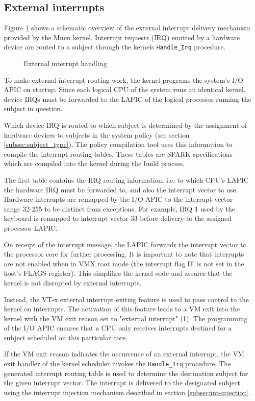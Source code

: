 \subsection{External interrupts}\label{subsec:external-ints}
Figure \ref{fig:external-interrupt} shows a schematic overview of the external
interrupt delivery mechanism provided by the Muen kernel. Interrupt requests
(IRQ) emitted by a hardware device are routed to a subject through
the kernels \texttt{Handle\_Irq} procedure.

\begin{figure}[h]
	\centering
	
	\caption{External interrupt handling}
	\label{fig:external-interrupt}
\end{figure}

To make external interrupt routing work, the kernel programs the system's I/O
APIC on startup. Since each logical CPU of the system runs an identical kernel,
device IRQs must be forwarded to the LAPIC of the logical processor running the
subject in question.

Which device IRQ is routed to which subject is determined by the assignment of
hardware devices to subjects in the system policy (see section
\ref{subsec:subject_type}). The policy compilation tool uses this information to
compile the interrupt routing tables. These tables are SPARK specifications
which are compiled into the kernel during the build process.

The first table contains the IRQ routing information, i.e. to which CPU's LAPIC
the hardware IRQ must be forwarded to, and also the interrupt vector to use.
Hardware interrupts are remapped by the I/O APIC to the interrupt vector range
32-255 to be distinct from exceptions. For example, IRQ 1 used by the keyboard
is remapped to interrupt vector 33 before delivery to the assigned processor
LAPIC.

On receipt of the interrupt message, the LAPIC forwards the interrupt vector to
the processor core for further processing. It is important to note that
interrupts are not enabled when in VMX root mode (the interrupt flag
IF is not set in the host's FLAGS register). This simplifies the
kernel code and assures that the kernel is not disrupted by external interrupts.

Instead, the VT-x external interrupt exiting feature is used to pass control to
the kernel on interrupts. The activation of this feature leads to a VM exit
into the kernel with the VM exit reason set to "external interrupt" (1).  The
programming of the I/O APIC ensures that a CPU only receives interrupts
destined for a subject scheduled on this particular core.

If the VM exit reason indicates the occurrence of an external interrupt, the VM
exit handler of the kernel scheduler invokes the \texttt{Handle\_Irq} procedure.
The generated interrupt routing table is used to determine the destination
subject for the given interrupt vector. The interrupt is delivered to the
designated subject using the interrupt injection mechanism described in section
\ref{subsec:int-injection}.

